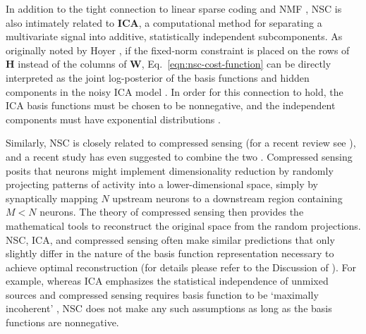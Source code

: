 In addition to the tight connection 
to linear sparse coding and \ac{NMF}
\cite{EggertKorner2004},
\ac{NSC} is also intimately related to \textbf{\ac{ICA}},
a computational method for separating a multivariate signal
into additive, statistically independent subcomponents. 
As originally noted by Hoyer \cite{Hoyer2002},
if the fixed-norm constraint is placed on the rows of
\textbf{H} instead of the columns of \textbf{W},
Eq.~\ref{eqn:nsc-cost-function} can be directly interpreted as the joint
log-posterior of the basis functions and hidden components
in the noisy \ac{ICA} model \cite{HoyerHyvarinen2002}.
In order for this connection to hold,
the \ac{ICA} basis functions must be chosen to be nonnegative,
and the independent components must have 
exponential distributions \cite{Hoyer2002}.

Similarly, \ac{NSC} is closely related to compressed sensing
(for a recent review see \cite{GanguliSompolinsky2012}),
and a recent study has even suggested to combine the two
\cite{WangLi2010}.
Compressed sensing posits that neurons might implement 
dimensionality reduction by randomly projecting patterns of activity
into a lower-dimensional space,
simply by synaptically mapping $N$ upstream neurons to a downstream region
containing $M < N$ neurons. 
The theory of compressed sensing then provides the mathematical tools
to reconstruct the original space from the random projections.
\ac{NSC}, \ac{ICA}, and compressed sensing often make similar predictions
that only slightly differ in the nature of the basis function representation
necessary to achieve optimal reconstruction
(for details please refer to the Discussion of \cite{GanguliSompolinsky2012}).
For example, whereas \ac{ICA} emphasizes the statistical independence 
of unmixed sources
and compressed sensing requires basis function to be `maximally incoherent'
\cite{GanguliSompolinsky2012},
\ac{NSC} does not make any such assumptions
as long as the basis functions are nonnegative.
